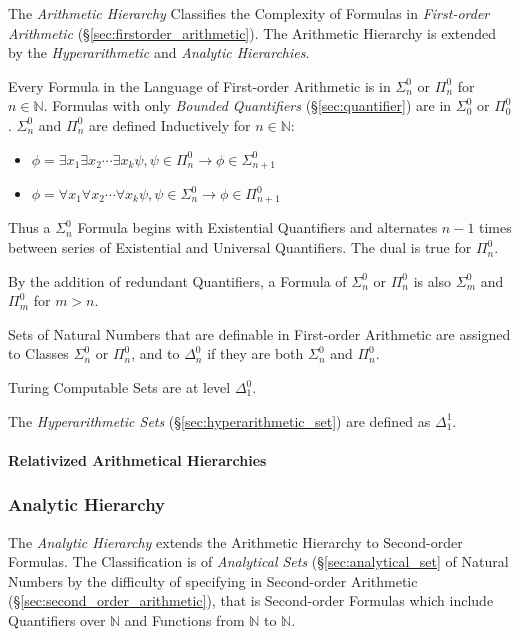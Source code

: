 The \emph{Arithmetic Hierarchy} Classifies the Complexity of Formulas
in \emph{First-order Arithmetic}
(\S\ref{sec:firstorder_arithmetic}). The Arithmetic Hierarchy is
extended by the \emph{Hyperarithmetic} and \emph{Analytic
  Hierarchies}.

Every Formula in the Language of First-order Arithmetic is in
$\Sigma^0_n$ or $\Pi^0_n$ for $n \in \mathbb{N}$. Formulas with only
\emph{Bounded Quantifiers} (\S\ref{sec:quantifier}) are in
$\Sigma^0_0$ or $\Pi^0_0$. $\Sigma^0_n$ and $\Pi^0_n$ are defined
Inductively for $n \in \mathbb{N}$:

\begin{itemize}
  \item $\phi = \exists x_1 \exists x_2 \cdots \exists x_k\psi, \psi
    \in \Pi^0_n \rightarrow \phi \in \Sigma^0_{n+1}$
  \item $\phi = \forall x_1 \forall x_2 \cdots \forall x_k\psi, \psi
    \in \Sigma^0_n \rightarrow \phi \in \Pi^0_{n+1}$
\end{itemize}

Thus a $\Sigma^0_n$ Formula begins with Existential Quantifiers and
alternates $n-1$ times between series of Existential and Universal
Quantifiers. The dual is true for $\Pi^0_n$.

By the addition of redundant Quantifiers, a Formula of $\Sigma^0_n$ or
$\Pi^0_n$ is also $\Sigma^0_m$ and $\Pi^0_m$ for $m > n$.

Sets of Natural Numbers that are definable in First-order Arithmetic
are assigned to Classes $\Sigma^0_n$ or $\Pi^0_n$, and to $\Delta^0_n$
if they are both $\Sigma^0_n$ and $\Pi^0_n$.

Turing Computable Sets are at level $\Delta^0_1$.

The \emph{Hyperarithmetic Sets} (\S\ref{sec:hyperarithmetic_set})
are defined as $\Delta^1_1$.

\paragraph{Relativized Arithmetical Hierarchies}



\subsubsection{Analytic Hierarchy}\label{sec:analytic_hierarchy}

The \emph{Analytic Hierarchy} extends the Arithmetic Hierarchy to
Second-order Formulas. The Classification is of \emph{Analytical Sets}
(\S\ref{sec:analytical_set} of Natural Numbers by the difficulty of
specifying in Second-order Arithmetic
(\S\ref{sec:second_order_arithmetic}), that is Second-order Formulas which
include Quantifiers over $\mathbb{N}$ and Functions from $\mathbb{N}$
to $\mathbb{N}$.

